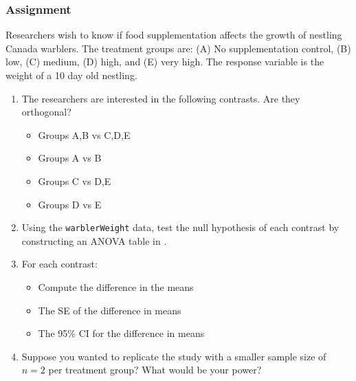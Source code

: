 \documentclass[color=usenames,dvipsnames]{beamer}\usepackage[]{graphicx}\usepackage[]{color}
\begin{document}
\begin{frame}
  \frametitle{Assignment}
  \footnotesize
  Researchers wish to know if food supplementation affects the growth
  of nestling Canada warblers. The treatment groups are: (A) No
  supplementation control, (B) low, (C) medium, (D) high, and (E) very
  high. The response variable is the weight of a 10 day old nestling.
  \begin{enumerate}[\bf (1)]
    \footnotesize
    \item<1-> The researchers are interested in the following
      contrasts. Are they orthogonal?
    \begin{itemize}
    \footnotesize
      \item Groups A,B vs C,D,E
      \item Groups A vs B
      \item Groups C vs D,E
      \item Groups D vs E
    \end{itemize}
    \item<2-> Using the {\tt warblerWeight} data, test the null
      hypothesis of each contrast by constructing an ANOVA table
       in \R.
    \item<3-> For each contrast:
      \begin{itemize}
        \footnotesize
        \item Compute the difference in the means
        \item The SE of the difference in means
        \item The 95\% CI for the difference in means
      \end{itemize}
    \item<4-> Suppose you wanted to replicate the study with a
      smaller sample size of $n=2$ per treatment group? What would be
      your power?
  \end{enumerate}

\end{frame}
\end{document}
